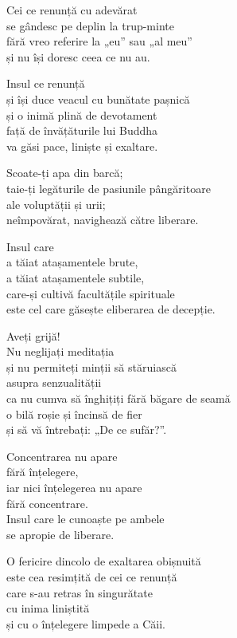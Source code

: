 Cei ce renunță cu adevărat\\
se gândesc pe deplin la trup-minte\\
fără vreo referire la „eu” sau „al meu”\\
și nu își doresc ceea ce nu au.


Insul ce renunță\\
și își duce veacul cu bunătate pașnică\\
și o inimă plină de devotament\\
față de învățăturile lui Buddha\\
va găsi pace, liniște și exaltare.


Scoate-ți apa din barcă;\\
taie-ți legăturile de pasiunile pângăritoare\\
ale voluptății și urii;\\
neîmpovărat, navighează către liberare.


Insul care\\
a tăiat atașamentele brute,\\
a tăiat atașamentele subtile,\\
care-și cultivă facultățile spirituale\\
este cel care găsește eliberarea de decepție.


Aveți grijă!\\
Nu neglijați meditația\\
și nu permiteți minții să stăruiască\\
asupra senzualității\\
ca nu cumva să înghițiți fără băgare de seamă\\
o bilă roșie și încinsă de fier\\
și să vă întrebați: „De ce sufăr?”.


Concentrarea nu apare\\
fără înțelegere,\\
iar nici înțelegerea nu apare\\
fără concentrare.\\
Insul care le cunoaște pe ambele\\
se apropie de liberare.


O fericire dincolo de exaltarea obișnuită\\
este cea resimțită de cei ce renunță\\
care s-au retras în singurătate\\
cu inima liniștită\\
și cu o înțelegere limpede a Căii.



